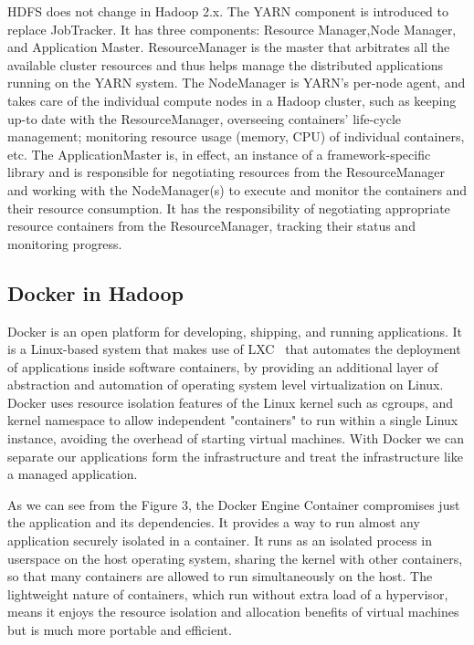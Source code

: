 HDFS does not change in Hadoop 2.x. The YARN component is introduced to replace JobTracker. It has three components: Resource Manager,Node Manager, and Application Master. ResourceManager is the master that arbitrates all the available cluster resources and thus helps manage the distributed applications running on the YARN system. The NodeManager is YARN’s per-node agent, and takes care of the individual compute nodes in a Hadoop cluster, such as keeping up-to date with the ResourceManager, overseeing containers’ life-cycle management; monitoring resource usage (memory, CPU) of individual containers, etc. The ApplicationMaster is, in effect, an instance of a framework-specific library and is responsible for negotiating resources from the ResourceManager and working with the NodeManager(s) to execute and monitor the containers and their resource consumption. It has the responsibility of negotiating appropriate resource containers from the ResourceManager, tracking their status and monitoring progress.

\subsection{Docker in Hadoop}
Docker is an open platform for developing, shipping, and running applications. It is a Linux-based system that makes use of LXC~\cite{helsley2009lxc} that automates the deployment of applications inside software containers, by providing an additional layer of abstraction and automation of operating system level virtualization on Linux. Docker uses resource isolation features of the Linux kernel such as cgroups, and kernel namespace to allow independent "containers" to run within a single Linux instance, avoiding the overhead of starting virtual machines. With Docker we can separate our applications form the infrastructure and treat the infrastructure like a managed application. 

As we can see from the Figure 3, the Docker Engine Container compromises just the application and its dependencies. It provides a way to run almost any application securely isolated in a container. It runs as an isolated process in userspace on the host operating system, sharing the kernel with other containers, so that many containers are allowed to run simultaneously on the host. The lightweight nature of containers, which run without extra load of a hypervisor, means it enjoys the resource isolation and allocation benefits of virtual machines but is much more portable and efficient.

